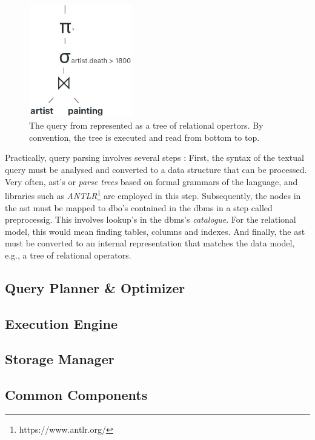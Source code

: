 \begin{figure}[htb]
    \centering
    \includegraphics[width=0.4\textwidth]{figures/query-tree.eps}
    \caption{The query from  represented as a tree of relational opertors. By convention, the tree is executed and read from bottom to top.}
    \label{figure:query-tree}
\end{figure}

Practically, query parsing involves several steps \cite{Garcia:2009Database}: First, the syntax of the textual query must be analysed and converted to a data structure that can be processed. Very often, \acrfull{ast}'s or \emph{parse trees} based on formal grammars of the language, and libraries such as \emph{ANTLR}\footnote{https://www.antlr.org/} are employed in this step. Subsequently, the nodes in the \acrshort{ast} must be mapped to \acrfull{dbo}'s contained in the \acrshort{dbms} in a step called preprocessig. This involves lookup's in the \acrshort{dbms}'s \emph{catalogue}. For the relational model, this would mean finding tables, columns and indexes. And finally, the \acrshort{ast} must be converted to an internal representation that matches the data model, e.g., a tree of relational operators.

\subsection{Query Planner \& Optimizer}

\subsection{Execution Engine}

\subsection{Storage Manager}


\subsection{Common Components}